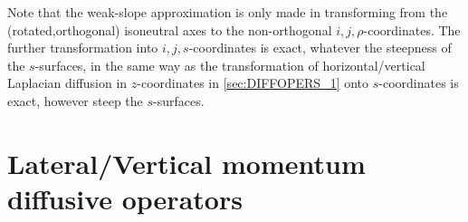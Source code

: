 \documentclass[../main/NEMO_manual]{subfiles}
\begin{document}
Note that the weak-slope approximation is only made in transforming from
the (rotated,orthogonal) isoneutral axes to the non-orthogonal $i,j,\rho$-coordinates.
The further transformation into $i,j,s$-coordinates is exact, whatever the steepness of the $s$-surfaces,
in the same way as the transformation of horizontal/vertical Laplacian diffusion in $z$-coordinates in
\autoref{sec:DIFFOPERS_1} onto $s$-coordinates is exact, however steep the $s$-surfaces.

\section{Lateral/Vertical momentum diffusive operators}
\label{sec:DIFFOPERS_3}
\end{document}
